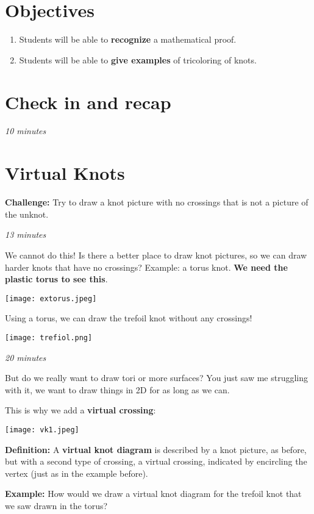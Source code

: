 \documentclass[12pt,letterpaper]{article}
\begin{document}
    \section*{Objectives}
    \begin{enumerate}
        \item Students will be able to \textbf{recognize} a mathematical proof.
        \item Students will be able to \textbf{give examples} of tricoloring of knots.
    \end{enumerate}
	\section{Check in and recap}
	    \textit{10 minutes}
	    
	    
	    \section{Virtual Knots}
	
	\textbf{Challenge:} Try to draw a knot picture with no crossings that is not a picture of the unknot.
	
	\textit{13 minutes}
	
	We cannot do this! Is there a better place to draw knot pictures, so we can draw harder knots that have no crossings? Example: a torus knot. \textbf{We need the plastic torus to see this}.
	
	\hspace{1cm}\texttt{[image: extorus.jpeg]}
	
	Using a torus, we can draw the trefoil knot without any crossings!
	
	\texttt{[image: trefiol.png]}
	
	\textit{20 minutes}
	
	But do we really want to draw tori or more surfaces? You just saw me struggling with it, we want to draw things in 2D for as long as we can.
	
    This is why we add a \textbf{virtual crossing}:
    
    \texttt{[image: vk1.jpeg]}
    
	\textbf{Definition:} A \textbf{virtual knot diagram} is described by a knot picture, as before, but with a second type of crossing, a virtual crossing, indicated by encircling the vertex (just as in the example before).
	
	\textbf{Example:}
	How would we draw a virtual knot diagram for the trefoil knot that we saw drawn in the torus?
	
\end{document}
